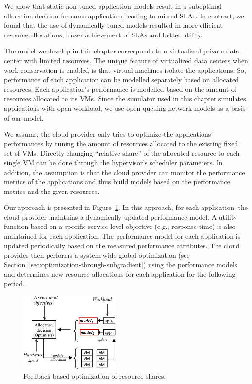 We show that static non-tuned application models result in a suboptimal allocation decision for some applications leading to missed SLAs. In contrast, we found that the use of dynamically tuned models resulted in more efficient resource allocations, closer achievement of SLAs and better utility. 

The model we develop in this chapter corresponds to a virtualized private data center with limited resources. The unique feature of virtualized data centers when work conservation is enabled is that virtual machines isolate the applications. So, performance of each application can be modelled separately based on allocated resources.
Each application's performance is modelled based on the amount of resources allocated to its VMs. Since the simulator used in this chapter simulates applications with open workload, we use open queuing network models as a basis of our model.

We assume, the cloud provider only tries to optimize the applications' performances by tuning the amount of resources allocated to the existing fixed set of VMs.  Directly changing ``relative share'' of the allocated resource to each single VM can be done through the hypervisor's scheduler parameters. In addition, the assumption is that the cloud provider can monitor the performance metrics of the applications and thus build models based on the performance metrics and the given resources.
 
Our approach is presented in Figure~\ref{fig:feedback-based-optimization}. 
In this approach, for each application, the  cloud provider maintains a dynamically updated performance model. 
A utility function based on a specific service level objective (e.g., response time) is also maintained for each application.    
The  performance model for each application is updated periodically based on the measured performance attributes.  The cloud provider then performs a system-wide global optimization (see Section~\ref{sec:optimization-through-subgradient}) using the performance models and determines new resource allocations for each application for the following period. 
\begin{figure}[h]
	\centering
		\includegraphics[width=0.45\textwidth]{image/centralized1/image2new}
	\caption[Architecture of the proposed feedback-based optimization approach for private cloud.]{Feedback based optimization of resource shares.} 
	\label{fig:feedback-based-optimization}
\end{figure}

